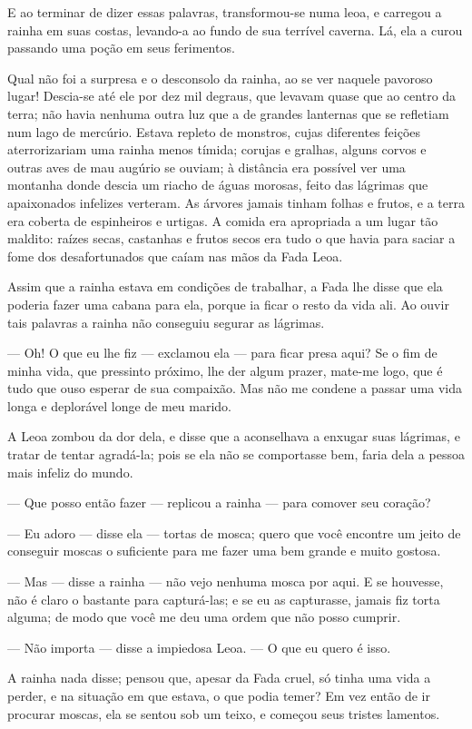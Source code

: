 E ao terminar de dizer essas palavras, transformou-se numa leoa, e
carregou a rainha em suas costas, levando-a ao fundo de sua terrível
caverna. Lá, ela a curou passando uma poção em seus ferimentos.

Qual não foi a surpresa e o desconsolo da rainha, ao se ver naquele
pavoroso lugar! Descia-se até ele por dez mil degraus, que levavam
quase que ao centro da terra; não havia nenhuma outra luz que a de
grandes lanternas que se refletiam num lago de mercúrio. Estava
repleto de monstros, cujas diferentes feições aterrorizariam uma
rainha menos tímida; corujas e gralhas, alguns corvos e outras aves
de mau augúrio se ouviam; à distância era possível ver uma montanha
donde descia um riacho de águas morosas, feito das lágrimas que
apaixonados infelizes verteram. As árvores jamais tinham folhas e
frutos, e a terra era coberta de espinheiros e urtigas. A comida era
apropriada a um lugar tão maldito: raízes secas, castanhas e frutos
secos era tudo o que havia para saciar a fome dos desafortunados que
caíam nas mãos da Fada Leoa.

Assim que a rainha estava em condições de trabalhar, a Fada lhe disse
que ela poderia fazer uma cabana para ela, porque ia ficar o resto da
vida ali. Ao ouvir tais palavras a rainha não conseguiu segurar as
lágrimas.

— Oh! O que eu lhe fiz — exclamou ela — para ficar presa aqui? Se o
fim de minha vida, que pressinto próximo, lhe der algum prazer,
mate-me logo, que é tudo que ouso esperar de sua compaixão. Mas não
me condene a passar uma vida longa e deplorável longe de meu marido. 

A Leoa zombou da dor dela, e disse que a aconselhava a enxugar suas
lágrimas, e tratar de tentar agradá-la; pois se ela não se
comportasse bem, faria dela a pessoa mais infeliz do mundo.

— Que posso então fazer — replicou a rainha — para comover seu
coração?

— Eu adoro — disse ela — tortas de mosca; quero que você encontre um
jeito de conseguir moscas o suficiente para me fazer uma bem grande e
muito gostosa.

— Mas — disse a rainha — não vejo nenhuma mosca por aqui. E se
houvesse, não é claro o bastante para capturá-las; e se eu as
capturasse, jamais fiz torta alguma; de modo que você me deu uma
ordem que não posso cumprir.

— Não importa — disse a impiedosa Leoa. — O que eu quero é isso.

A rainha nada disse; pensou que, apesar da Fada cruel, só tinha uma
vida a perder, e na situação em que estava, o que podia temer? Em vez
então de ir procurar moscas, ela se sentou sob um teixo, e começou
seus tristes lamentos.

